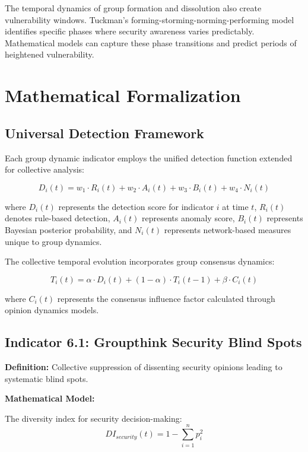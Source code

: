 \documentclass[11pt,a4paper]{article}
\begin{document}
The temporal dynamics of group formation and dissolution also create vulnerability windows. Tuckman's \cite{tuckman1965} forming-storming-norming-performing model identifies specific phases where security awareness varies predictably. Mathematical models can capture these phase transitions and predict periods of heightened vulnerability.

\section{Mathematical Formalization}

\subsection{Universal Detection Framework}

Each group dynamic indicator employs the unified detection function extended for collective analysis:

\begin{equation}
D_i(t) = w_1 \cdot R_i(t) + w_2 \cdot A_i(t) + w_3 \cdot B_i(t) + w_4 \cdot N_i(t)
\end{equation}

where $D_i(t)$ represents the detection score for indicator $i$ at time $t$, $R_i(t)$ denotes rule-based detection, $A_i(t)$ represents anomaly score, $B_i(t)$ represents Bayesian posterior probability, and $N_i(t)$ represents network-based measures unique to group dynamics.

The collective temporal evolution incorporates group consensus dynamics:

\begin{equation}
T_i(t) = \alpha \cdot D_i(t) + (1-\alpha) \cdot T_i(t-1) + \beta \cdot C_i(t)
\end{equation}

where $C_i(t)$ represents the consensus influence factor calculated through opinion dynamics models.

\subsection{Indicator 6.1: Groupthink Security Blind Spots}

\textbf{Definition:} Collective suppression of dissenting security opinions leading to systematic blind spots.

\textbf{Mathematical Model:}

The diversity index for security decision-making:
\begin{equation}
DI_{security}(t) = 1 - \sum_{i=1}^n p_i^2
\end{equation}
\end{document}
